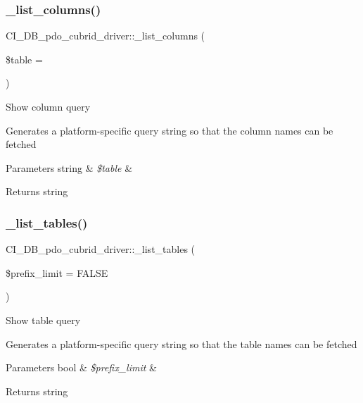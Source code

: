 \subsubsection{\texorpdfstring{\+\_\+list\+\_\+columns()}{\_list\_columns()}}
{\footnotesize\ttfamily C\+I\+\_\+\+D\+B\+\_\+pdo\+\_\+cubrid\+\_\+driver\+::\+\_\+list\+\_\+columns (\begin{DoxyParamCaption}\item[{}]{\$table = {\ttfamily \textquotesingle{}\textquotesingle{}} }\end{DoxyParamCaption})\hspace{0.3cm}{\ttfamily [protected]}}

Show column query

Generates a platform-\/specific query string so that the column names can be fetched


\begin{DoxyParams}[1]{Parameters}
string & {\em \$table} & \\
\hline
\end{DoxyParams}
\begin{DoxyReturn}{Returns}
string 
\end{DoxyReturn}
\mbox{\label{class_c_i___d_b__pdo__cubrid__driver_afa72b19fd41d5cde641b19e60300bc8a}} 
\subsubsection{\texorpdfstring{\+\_\+list\+\_\+tables()}{\_list\_tables()}}
{\footnotesize\ttfamily C\+I\+\_\+\+D\+B\+\_\+pdo\+\_\+cubrid\+\_\+driver\+::\+\_\+list\+\_\+tables (\begin{DoxyParamCaption}\item[{}]{\$prefix\+\_\+limit = {\ttfamily FALSE} }\end{DoxyParamCaption})\hspace{0.3cm}{\ttfamily [protected]}}

Show table query

Generates a platform-\/specific query string so that the table names can be fetched


\begin{DoxyParams}[1]{Parameters}
bool & {\em \$prefix\+\_\+limit} & \\
\hline
\end{DoxyParams}
\begin{DoxyReturn}{Returns}
string 
\end{DoxyReturn}
\mbox{\label{class_c_i___d_b__pdo__cubrid__driver_a48df755481b33830057f3f607e2e0ca9}} 
